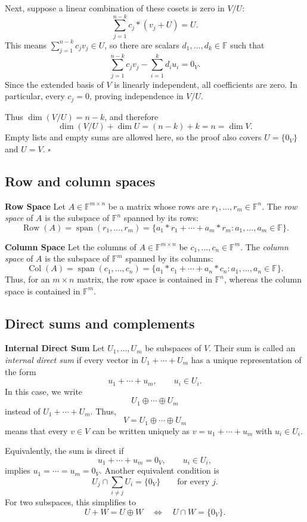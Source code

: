 \documentclass[a4paper,11pt,abstract=true]{scrartcl}
\theoremstyle{dotlessP}
\theoremstyle{dotlessS}
\theoremstyle{remark}
\theoremstyle{definition}
\begin{document}
Next, suppose a linear combination of these cosets is zero in $V/U$:
\[
\sum_{j=1}^{n-k}c_j*(v_j+U)=U.
\]
This means $\sum_{j=1}^{n-k}c_j v_j\in U$, so there are scalars
$d_1,\ldots,d_k\in\mathbb{F}$ such that
\[
\sum_{j=1}^{n-k}c_j v_j-\sum_{i=1}^{k}d_i u_i=0_V.
\]
Since the extended basis of $V$ is linearly independent, all coefficients
are zero. In particular, every $c_j=0$, proving independence in $V/U$.

Thus $\dim(V/U)=n-k$, and therefore
\[
\dim(V/U)+\dim U=(n-k)+k=n=\dim V.
\]
Empty lists and empty sums are allowed here, so the proof also covers
$U=\{0_V\}$ and $U=V$. \hfill$\square$

\subsection{Row and column spaces}
\textbf{Row Space} Let $A\in \mathbb{F}^{m\times n}$ be a matrix whose
rows are $r_1,\ldots,r_m\in \mathbb{F}^n$. The \emph{row space} of $A$ is the subspace
of $\mathbb{F}^n$ spanned by its rows:
\[
\operatorname{Row}(A)
=\operatorname{span}(r_1,\ldots,r_m)
=\{a_1*r_1+\cdots+a_m*r_m:a_1,\ldots,a_m\in \mathbb{F}\}.
\]

\textbf{Column Space} Let the columns of
$A\in \mathbb{F}^{m\times n}$ be $c_1,\ldots,c_n\in \mathbb{F}^m$. The \emph{column space} of
$A$ is the subspace of $\mathbb{F}^m$ spanned by its columns:
\[
\operatorname{Col}(A)
=\operatorname{span}(c_1,\ldots,c_n)
=\{a_1*c_1+\cdots+a_n*c_n:a_1,\ldots,a_n\in \mathbb{F}\}.
\]
Thus, for an $m\times n$ matrix, the row space is contained in $\mathbb{F}^n$, whereas
the column space is contained in $\mathbb{F}^m$.

\subsection{Direct sums and complements}
\textbf{Internal Direct Sum} Let $U_1,\ldots,U_m$ be subspaces
of $V$. Their sum is called an \emph{internal direct sum} if every vector in
$U_1+\cdots+U_m$ has a unique representation of the form
\[
u_1+\cdots+u_m,
\qquad u_i\in U_i.
\]
In this case, we write
\[
U_1\oplus\cdots\oplus U_m
\]
instead of $U_1+\cdots+U_m$. Thus,
\[
V=U_1\oplus\cdots\oplus U_m
\]
means that every $v\in V$ can be written uniquely as
$v=u_1+\cdots+u_m$ with $u_i\in U_i$.

Equivalently, the sum is direct if
\[
u_1+\cdots+u_m=0_V,
\qquad u_i\in U_i,
\]
implies $u_1=\cdots=u_m=0_V$. Another equivalent condition is
\[
U_j\cap\sum_{i\neq j}U_i=\{0_V\}
\qquad\text{for every }j.
\]
For two subspaces, this simplifies to
\[
U+W=U\oplus W
\quad\Longleftrightarrow\quad
U\cap W=\{0_V\}.
\]
\end{document}
